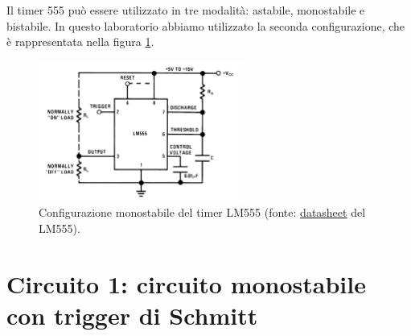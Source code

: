 \documentclass{report}
\begin{document}
Il timer 555 può essere utilizzato in tre modalità: astabile, monostabile e bistabile. In questo laboratorio abbiamo utilizzato la seconda configurazione, che è rappresentata nella figura \ref{figura:timer2}.
\begin{figure}[h!]
	\centering
	\includegraphics[height=4.6cm]{immagini/timer3}
	\caption{Configurazione monostabile del timer LM555 (fonte: \textcolor{blue}{\underline{\href{https://www.ti.com/lit/ds/symlink/lm555.pdf?ts=1667144089940&ref_url=https\%253A\%252F\%252Fwww.ti.com\%252Fproduct\%252FLM555}{datasheet}}} del LM555).}
	\label{figura:timer2}
\end{figure}

\newpage
\section{Circuito 1: circuito monostabile con trigger di Schmitt}
\end{document}
